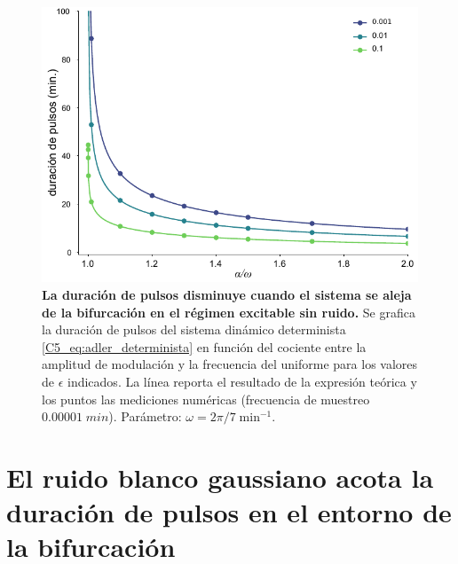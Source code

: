 \documentclass[./main.tex]{subfiles}
\begin{document}
 \begin{figure}
    \centering
    \includegraphics[width=1\columnwidth]{figures/chapter5/C5_T_exc.pdf} 
    \caption{\textbf{La duración de pulsos disminuye cuando el sistema se aleja de la bifurcación en el régimen excitable sin ruido.} Se grafica la duración de pulsos del sistema dinámico determinista \ref{C5_eq:adler_determinista} en función del cociente entre la amplitud de modulación y la frecuencia del uniforme \dddelta para los valores de $\epsilon$ indicados. La línea reporta el resultado de la expresión teórica y los puntos las mediciones numéricas (frecuencia de muestreo $0.00001\; min$). Parámetro: $\omega=2\pi/7\;\text{min}^{-1}$.}
    \label{C5_fig:T_exc_res}
\end{figure}


\section{El ruido blanco gaussiano acota la duración de pulsos en el entorno de la bifurcación}
\label{C6_sec:duracion}
\end{document}
